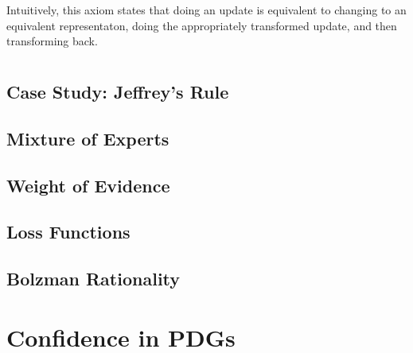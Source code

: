 \documentclass{article}
\begin{document}
Intuitively, this axiom states that doing an update is equivalent to changing to an equivalent representaton, doing the appropriately transformed update, and then transforming back.



\section{}
\subsection{Case Study: Jeffrey's Rule}
\subsection{Mixture of Experts}

\subsection{Weight of Evidence}
\subsection{Loss Functions}
\subsection{Bolzman Rationality}
\section{Confidence in PDGs}
\subsection{}
\end{document}
